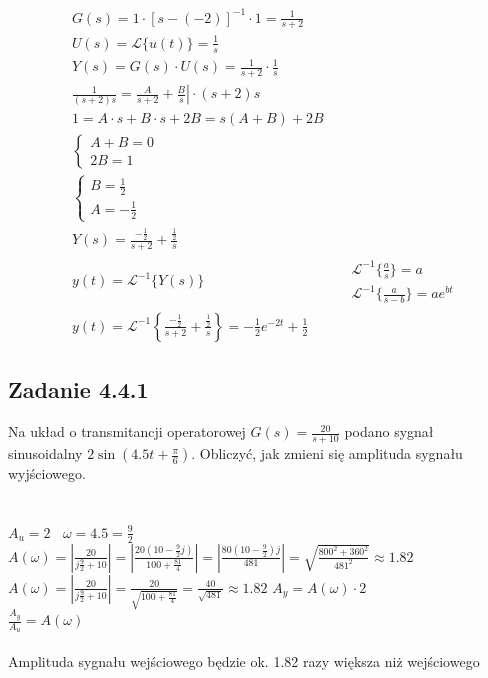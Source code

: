 \begin{equation*}
\begin{aligned}
& G(s) = 1 \cdot [s - (-2)]^{-1} \cdot 1 = \frac{1}{s+2} \\
& U(s) = \mathscr{L}\{u(t)\} = \frac{1}{s} \\
& Y(s) = G(s) \cdot U(s) = \frac{1}{s+2} \cdot \frac{1}{s} \\
& \frac{1}{(s+2)s} = \left. \frac{A}{s+2} + \frac{B}{s} \right| \cdot (s+2)s \\
& 1 = A \cdot s + B \cdot s + 2B = s(A+B) + 2B \\
& \begin{cases}
A+B = 0 \\
2B = 1
\end{cases} \\
& \begin{cases}
B = \frac12 \\
A = -\frac12
\end{cases} \\
& Y(s) = \frac{-\frac12}{s+2} + \frac{\frac12}{s} \\
& y(t) = \mathscr{L}^{-1}\{Y(s)\}
& \begin{array}{rl}
	& \mathscr{L}^{-1}\{\frac{a}{s}\} = a \\
	& \mathscr{L}^{-1}\{\frac{a}{s-b}\} = ae^{bt}
\end{array} \\
& y(t) = \mathscr{L}^{-1}\left\{ \frac{-\frac12}{s+2} + \frac{\frac12}{s} \right\} = \boxed{ -\frac12e^{-2t} + \frac12 }
\end{aligned}
\end{equation*}


\pagebreak
\subsection*{Zadanie 4.4.1} {\color{darkgray}
	Na układ o transmitancji operatorowej $G(s)=\frac{20}{s+10}$ podano sygnał sinusoidalny $2\sin(4.5t+\frac \pi 6)$. Obliczyć, jak zmieni się amplituda sygnału wyjściowego.\\
}\lineh
\\\\
$A_u=2 \ \ \ \ \omega = 4.5=\frac 9 2$\\
$A(\omega)=|\frac{20}{j \frac 9 2 + 10}|=|\frac{20(10-\frac 9 2 j)}{100+\frac{81}{4}}|=|\frac{80(10-\frac 9 2)j}{481}|=\sqrt{\frac{800^2+360^2}{481^2}}\approx 1.82$\\
 {\color{lightgray}$A(\omega)=|\frac{20}{j\frac 9 2 +10}|=\frac{20}{\sqrt{100+\frac{81}{4}}}= \frac{40}{\sqrt{481}} \approx 1.82$}
$A_y=A(\omega)\cdot 2$\\
$\frac{A_y}{A_u}=A(\omega)$\\
\\
Amplituda sygnału wejściowego będzie ok. 1.82 razy większa niż wejściowego\\

